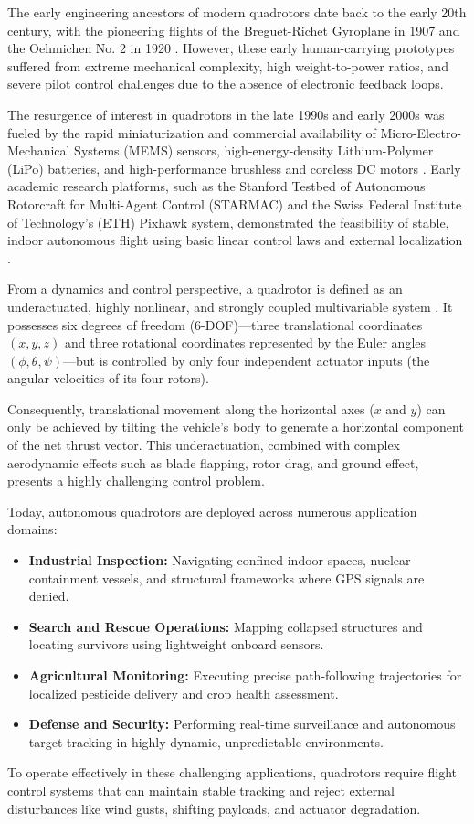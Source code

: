 The early engineering ancestors of modern quadrotors date back to the early 20th century, with the pioneering flights of the Breguet-Richet Gyroplane in 1907 and the Oehmichen No. 2 in 1920 \cite{ref_10}. However, these early human-carrying prototypes suffered from extreme mechanical complexity, high weight-to-power ratios, and severe pilot control challenges due to the absence of electronic feedback loops.

The resurgence of interest in quadrotors in the late 1990s and early 2000s was fueled by the rapid miniaturization and commercial availability of Micro-Electro-Mechanical Systems (MEMS) sensors, high-energy-density Lithium-Polymer (LiPo) batteries, and high-performance brushless and coreless DC motors \cite{ref_12, ref_25}. Early academic research platforms, such as the Stanford Testbed of Autonomous Rotorcraft for Multi-Agent Control (STARMAC) and the Swiss Federal Institute of Technology's (ETH) Pixhawk system, demonstrated the feasibility of stable, indoor autonomous flight using basic linear control laws and external localization \cite{ref_10}.

From a dynamics and control perspective, a quadrotor is defined as an underactuated, highly nonlinear, and strongly coupled multivariable system \cite{ref_11, ref_21}. It possesses six degrees of freedom (6-DOF)—three translational coordinates $(x, y, z)$ and three rotational coordinates represented by the Euler angles $(\phi, \theta, \psi)$—but is controlled by only four independent actuator inputs (the angular velocities of its four rotors). 

Consequently, translational movement along the horizontal axes ($x$ and $y$) can only be achieved by tilting the vehicle's body to generate a horizontal component of the net thrust vector. This underactuation, combined with complex aerodynamic effects such as blade flapping, rotor drag, and ground effect, presents a highly challenging control problem.

Today, autonomous quadrotors are deployed across numerous application domains:
\begin{itemize}
    \item \textbf{Industrial Inspection:} Navigating confined indoor spaces, nuclear containment vessels, and structural frameworks where GPS signals are denied.
    \item \textbf{Search and Rescue Operations:} Mapping collapsed structures and locating survivors using lightweight onboard sensors.
    \item \textbf{Agricultural Monitoring:} Executing precise path-following trajectories for localized pesticide delivery and crop health assessment.
    \item \textbf{Defense and Security:} Performing real-time surveillance and autonomous target tracking in highly dynamic, unpredictable environments.
\end{itemize}
To operate effectively in these challenging applications, quadrotors require flight control systems that can maintain stable tracking and reject external disturbances like wind gusts, shifting payloads, and actuator degradation.

